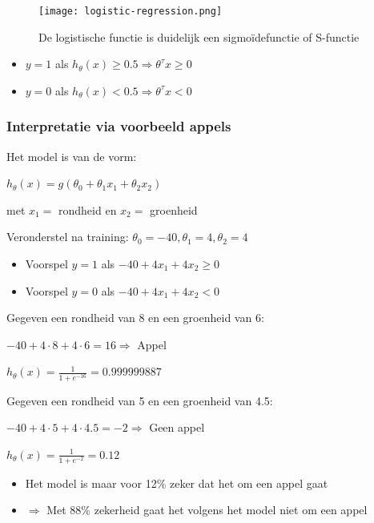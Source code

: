 \documentclass{article}
\begin{document}
\begin{figure}[H]
    \centering
    \texttt{[image: logistic-regression.png]}
    \caption{De logistische functie is duidelijk een sigmoïdefunctie of S-functie}
\end{figure}

\begin{itemize}
    \item $y=1$ als $h_{\theta}(x) \geq 0.5 \Rightarrow \theta^{\tau}x \geq 0$
    \item $y=0$ als $h_{\theta}(x) < 0.5 \Rightarrow \theta^{\tau}x < 0$
\end{itemize}

\subsubsection{Interpretatie via voorbeeld appels}

Het model is van de vorm:

\begin{center}
    $h_{\theta}(x) = g(\theta_0 + \theta_1x_1 + \theta_2x_2)$

    met $x_1=$ rondheid en $x_2=$ groenheid
\end{center}

Veronderstel na training: $\theta_0=-40, \theta_1=4, \theta_2=4$

\begin{itemize}
    \item Voorspel $y=1$ als $-40 + 4x_1 + 4x_2 \geq 0$
    \item Voorspel $y=0$ als $-40 + 4x_1 + 4x_2 < 0$
\end{itemize}

Gegeven een rondheid van 8 en een groenheid van 6:

\begin{center}
    $-40 + 4 \cdot 8 + 4 \cdot 6 = 16 \Rightarrow $ Appel

    $h_{\theta}(x) = \frac{1}{1 + e^{-16}} = 0.999999887$
\end{center}

Gegeven een rondheid van 5 en een groenheid van 4.5:

\begin{center}
    $-40 + 4 \cdot 5 + 4 \cdot 4.5 = -2 \Rightarrow $ Geen appel

    $h_{\theta}(x) = \frac{1}{1 + e^{-2}} = 0.12$
\end{center}

\begin{itemize}
    \item Het model is maar voor 12\% zeker dat het om een appel gaat
    \item $\Rightarrow$ Met 88\% zekerheid gaat het volgens het model niet om een appel
\end{itemize}
\end{document}

